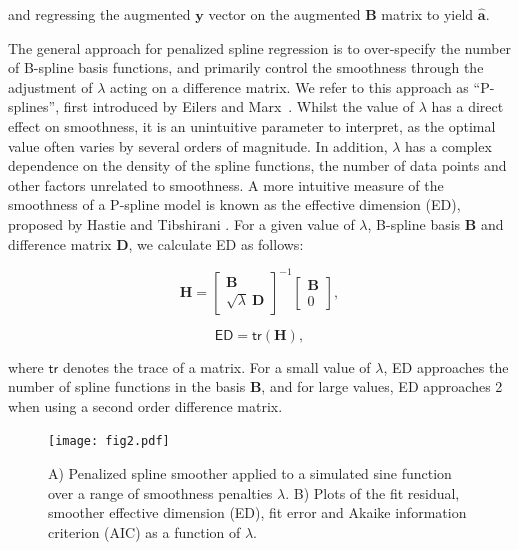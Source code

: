 \documentclass[num-refs]{wiley-article}
\begin{document}
and regressing the augmented $\mathbf{y}$ vector on the augmented $\mathbf{B}$ matrix to yield $\hat{\mathbf{a}}$.

The general approach for penalized spline regression is to over-specify the number of B-spline basis functions, and primarily control the smoothness through the adjustment of $\lambda$ acting on a difference matrix. We refer to this approach as ``P-splines'', first introduced by Eilers and Marx~\cite{Eilers1996}. Whilst the value of $\lambda$ has a direct effect on smoothness, it is an unintuitive parameter to interpret, as the optimal value often varies by several orders of magnitude. In addition, $\lambda$ has a complex dependence on the density of the spline functions, the number of data points and other factors unrelated to smoothness. A more intuitive measure of the smoothness of a P-spline model is known as the effective dimension (ED), proposed by Hastie and Tibshirani \cite{Hastie1990}. For a given value of $\lambda$, B-spline basis $\mathbf{B}$ and difference matrix $\mathbf{D}$, we calculate ED as follows:

\begin{equation}
  \mathbf{H} =
  \begin{bmatrix}
    \mathbf{B} \\ \sqrt{\lambda}\ \mathbf{D}
  \end{bmatrix}^{-1}
  \begin{bmatrix}
    \mathbf{B} \\ 0
  \end{bmatrix},
\end{equation}

\begin{equation}
  \textsf{ED} = \textsf{tr}(\mathbf{H}),
\end{equation}

where $\textsf{tr}$ denotes the trace of a matrix. For a small value of $\lambda$, ED approaches the number of spline functions in the basis $\mathbf{B}$, and for large values, ED approaches 2 when using a second order difference matrix.

\begin{figure}
  \begin{center}
    \texttt{[image: fig2.pdf]}
    \caption{A) Penalized spline smoother applied to a simulated sine function over a range of smoothness penalties $\lambda$. B) Plots of the fit residual, smoother effective dimension (ED), fit error and Akaike information criterion (AIC) as a function of $\lambda$.}
    \label{pspline_error}
  \end{center}
\end{figure}
\end{document}
